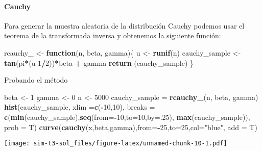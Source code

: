 \documentclass[]{article}
\newenvironment{Shaded}{\begin{snugshade}}{\end{snugshade}}
\newcommand{\ControlFlowTok}[1]{\textcolor[rgb]{0.13,0.29,0.53}{\textbf{#1}}}
\newcommand{\DataTypeTok}[1]{\textcolor[rgb]{0.13,0.29,0.53}{#1}}
\newcommand{\DecValTok}[1]{\textcolor[rgb]{0.00,0.00,0.81}{#1}}
\newcommand{\KeywordTok}[1]{\textcolor[rgb]{0.13,0.29,0.53}{\textbf{#1}}}
\newcommand{\NormalTok}[1]{#1}
\newcommand{\OperatorTok}[1]{\textcolor[rgb]{0.81,0.36,0.00}{\textbf{#1}}}
\newcommand{\StringTok}[1]{\textcolor[rgb]{0.31,0.60,0.02}{#1}}
\let\oldparagraph\paragraph
\renewcommand{\paragraph}[1]{\oldparagraph{#1}\mbox{}}
\begin{document}
\hypertarget{cauchy}{%
\paragraph{Cauchy}\label{cauchy}}

Para generar la muestra aleatoria de la distribución Cauchy podemos usar
el teorema de la transformada inversa y obtenemos la siguiente función:

\begin{Shaded}
\begin{Highlighting}[]
\NormalTok{rcauchy_ <-}\StringTok{ }\ControlFlowTok{function}\NormalTok{(n, beta, gamma)\{}
\NormalTok{  u <-}\StringTok{ }\KeywordTok{runif}\NormalTok{(n)}
\NormalTok{  cauchy_sample <-}\StringTok{ }\KeywordTok{tan}\NormalTok{(pi}\OperatorTok{*}\NormalTok{(u}\DecValTok{-1}\OperatorTok{/}\DecValTok{2}\NormalTok{))}\OperatorTok{*}\NormalTok{beta }\OperatorTok{+}\StringTok{ }\NormalTok{gamma}
  \KeywordTok{return}\NormalTok{ (cauchy_sample)}
\NormalTok{\}}
\end{Highlighting}
\end{Shaded}

Probando el método

\begin{Shaded}
\begin{Highlighting}[]
\NormalTok{beta <-}\StringTok{ }\DecValTok{1}
\NormalTok{gamma <-}\StringTok{ }\DecValTok{0}
\NormalTok{n <-}\StringTok{ }\DecValTok{5000}
\NormalTok{cauchy_sample =}\StringTok{ }\KeywordTok{rcauchy_}\NormalTok{(n, beta, gamma)}
\KeywordTok{hist}\NormalTok{(cauchy_sample, }\DataTypeTok{xlim =}\KeywordTok{c}\NormalTok{(}\OperatorTok{-}\DecValTok{10}\NormalTok{,}\DecValTok{10}\NormalTok{), }\DataTypeTok{breaks =} \KeywordTok{c}\NormalTok{(}\KeywordTok{min}\NormalTok{(cauchy_sample),}\KeywordTok{seq}\NormalTok{(}\DataTypeTok{from=}\OperatorTok{-}\DecValTok{10}\NormalTok{,}\DataTypeTok{to=}\DecValTok{10}\NormalTok{,}\DataTypeTok{by=}\NormalTok{.}\DecValTok{25}\NormalTok{), }\KeywordTok{max}\NormalTok{(cauchy_sample)), }\DataTypeTok{prob =}\NormalTok{ T)}
\KeywordTok{curve}\NormalTok{(}\KeywordTok{cauchy}\NormalTok{(x,beta,gamma),}\DataTypeTok{from=}\OperatorTok{-}\DecValTok{25}\NormalTok{,}\DataTypeTok{to=}\DecValTok{25}\NormalTok{,}\DataTypeTok{col=}\StringTok{"blue"}\NormalTok{, }\DataTypeTok{add =}\NormalTok{ T)}
\end{Highlighting}
\end{Shaded}

\texttt{[image: sim-t3-sol\_files/figure-latex/unnamed-chunk-10-1.pdf]}
\end{document}
